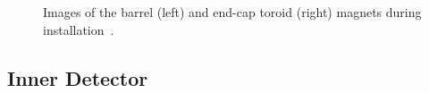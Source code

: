 \begin{figure}[htbp]
	\centering
	\hfill
	\caption[Images of the barrel (left) and end-cap toroid (right) magnets during installation.]{Images of the barrel (left) and end-cap toroid (right) magnets during installation~\cite{atlasphotos}.}
	\label{fig:ATLAS-toroids}
\end{figure}




\subsection{Inner Detector}\label{sec:ATLAS-inner-detector}

